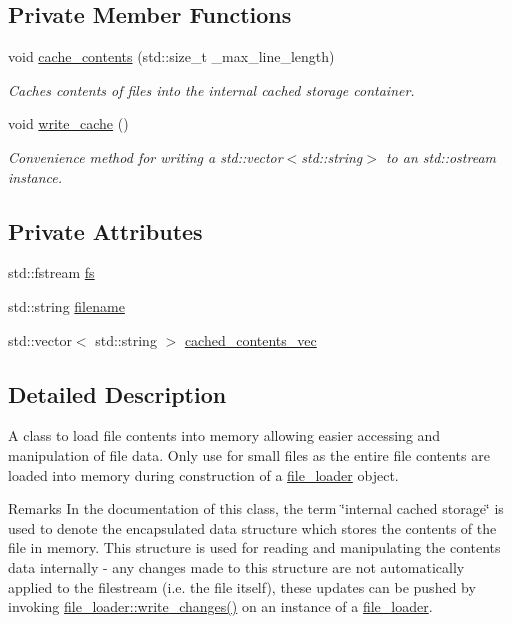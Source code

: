 \subsection*{Private Member Functions}
\begin{DoxyCompactItemize}
\item 
void \hyperlink{classcrsc_1_1file__loader_a1dface49298311d30379db8e7b3a0fbc}{cache\+\_\+contents} (std\+::size\+\_\+t \+\_\+max\+\_\+line\+\_\+length)
\begin{DoxyCompactList}\small\item\em Caches contents of files into the internal cached storage container. \end{DoxyCompactList}\item 
void \hyperlink{classcrsc_1_1file__loader_a84c6294ab6265b35dfc817965226f0c1}{write\+\_\+cache} ()
\begin{DoxyCompactList}\small\item\em Convenience method for writing a std\+::vector$<$std\+::string$>$ to an std\+::ostream instance. \end{DoxyCompactList}\end{DoxyCompactItemize}
\subsection*{Private Attributes}
\begin{DoxyCompactItemize}
\item 
std\+::fstream \hyperlink{classcrsc_1_1file__loader_a7957bc89279fd8ba00c6511cdef26134}{fs}
\item 
std\+::string \hyperlink{classcrsc_1_1file__loader_af656c06c4193868b5b13f29e5ccbf5d7}{filename}
\item 
std\+::vector$<$ std\+::string $>$ \hyperlink{classcrsc_1_1file__loader_a66bc2dbbce9b17845a19526de7a8b3f1}{cached\+\_\+contents\+\_\+vec}
\end{DoxyCompactItemize}


\subsection{Detailed Description}
A class to load file contents into memory allowing easier accessing and manipulation of file data. Only use for small files as the entire file contents are loaded into memory during construction of a \hyperlink{classcrsc_1_1file__loader}{file\+\_\+loader} object. 

\begin{DoxyRemark}{Remarks}
In the documentation of this class, the term \char`\"{}internal cached storage\char`\"{} is used to denote the encapsulated data structure which stores the contents of the file in memory. This structure is used for reading and manipulating the contents data internally -\/ any changes made to this structure are not automatically applied to the filestream (i.\+e. the file itself), these updates can be pushed by invoking \hyperlink{classcrsc_1_1file__loader_ac9bb6c7bfaad062e7711746976417774}{file\+\_\+loader\+::write\+\_\+changes()} on an instance of a \hyperlink{classcrsc_1_1file__loader}{file\+\_\+loader}. 
\end{DoxyRemark}


